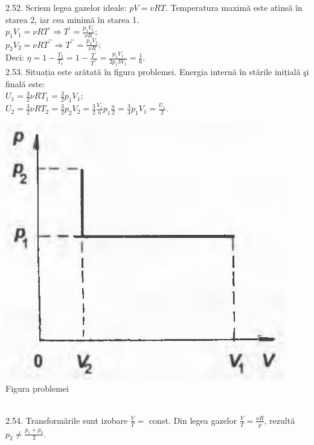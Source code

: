 2.52. Scriem legea gazelor ideale: $p V=v R T$. Temperatura maximă este atinsă în starea 2, iar cea minimă în starea 1.\\ $p_{1} V_{1}=\nu R T^{\prime} \Rightarrow T^{\prime}=\frac{p_{1} V_{1}}{\nu R}$;\\ $p_{2} V_{2}=\nu R T^{\prime \prime} \Rightarrow T^{\prime \prime}=\frac{p_{2} V_{2}}{\nu R}$;\\ Deci: $\eta=1-\frac{T_{2}}{T_{1}}=1-\frac{T^{\prime}}{T^{\prime \prime}}=\frac{p_{1} V_{1}}{2 p_{1} 3 V_{1}}=\frac{1}{6}$.\\

2.53. Situația este arătată în figura problemei. Energia internă în stările inițială şi finală este:\\ $U_{1}=\frac{3}{2} \nu R T_{1}=\frac{3}{2} p_{1} V_{1}$;\\ $U_{2}=\frac{3}{2} \nu R T_{2}=\frac{3}{2} p_{2} V_{2}=\frac{3}{2} \frac{V_{1}}{n} p_{1} \frac{n}{2}=\frac{3}{4} p_{1} V_{1}=\frac{U_{1}}{2}$.\\ \begin{center} \includegraphics[width=0.4\linewidth]{images/2025_07_01_5b3ff9fa0d508c8e9f17g-281(1)}\\ Figura problemei \end{center}\\

2.54. Transformările sunt izobare $\frac{V}{T}=$ const. Din legea gazelor $\frac{V}{T}=\frac{\nu R}{p}$, rezultă $p_{2} \neq \frac{p_{1}+p_{3}}{2}$.\\

